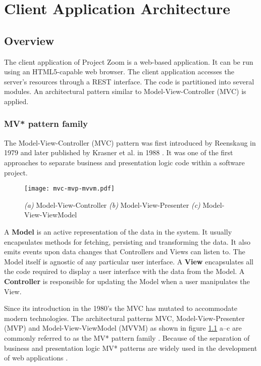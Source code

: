 \chapter{Client Application Architecture}

\section{Overview}
The client application of Project Zoom is a web-based application. It can be run using an HTML5-capable web browser. The client application accesses the server's resources through a REST interface. The code is partitioned into several modules. An architectural pattern similar to Model-View-Controller (MVC) is applied.

\subsection{MV* pattern family}
The Model-View-Controller (MVC) pattern was first introduced by Reenskaug in 1979 \cite{Reenskaug_1979} and later published by Krasner et al. in 1988 \cite{Krasner_1988}. It was one of the first approaches to separate business and presentation logic code within a software project.

\begin{figure}
\texttt{[image: mvc-mvp-mvvm.pdf]}
\caption[Diagrams of Model-View-Controller, Model-View-Presenter and Model-View-ViewModel]{\textit{(a)} Model-View-Controller \textit{(b)} Model-View-Presenter \textit{(c)} Model-View-ViewModel}
\label{fig:MV}
\end{figure}

A \textbf{Model} is an active representation of the data in the system. It usually encapsulates methods for fetching, persisting and transforming the data. It also emits events upon data changes that Controllers and Views can listen to. The Model itself is agnostic of any particular user interface. A \textbf{View} encapsulates all the code required to display a user interface with the data from the Model. A \textbf{Controller} is responsible for updating the Model when a user manipulates the View. \cite{Krasner_1988} \cite{Gamma_1994}

Since its introduction in the 1980's the MVC has mutated to accommodate modern technologies. The architectural patterns MVC, Model-View-Presenter (MVP) and Model-View-ViewModel (MVVM) as shown in figure \ref{fig:MV} a–c are commonly referred to as the MV* pattern family \cite{Osmani_2012}. Because of the separation of business and presentation logic MV* patterns are widely used in the development of web applications \cite{Takada_2012}.

